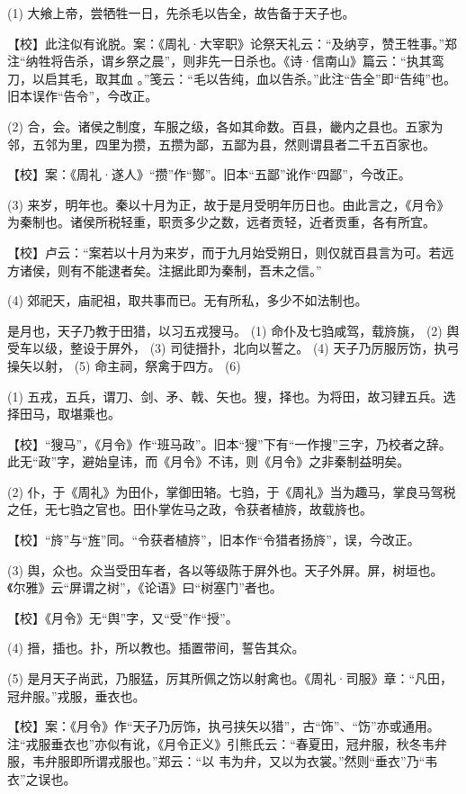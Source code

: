 \documentclass[12pt,UTF8]{ctexbook}
\begin{document}
(1) 大飨上帝，尝牺牲一日，先杀毛以告全，故告备于天子也。

【校】此注似有讹脱。案：《周礼·大宰职》论祭天礼云：“及纳亨，赞王牲事。”郑注“纳牲将告杀，谓乡祭之晨”，则非先一日杀也。《诗·信南山》篇云：“执其鸾刀，以启其毛，取其血 。”笺云：“毛以告纯，血以告杀。”此注“告全”即“告纯”也。旧本误作“告令”，今改正。

(2) 合，会。诸侯之制度，车服之级，各如其命数。百县，畿内之县也。五家为邻，五邻为里，四里为攒，五攒为鄙，五鄙为县，然则谓县者二千五百家也。

【校】案：《周礼·遂人》“攒”作“酂”。旧本“五鄙”讹作“四鄙”，今改正。

(3) 来岁，明年也。秦以十月为正，故于是月受明年历日也。由此言之，《月令》为秦制也。诸侯所税轻重，职贡多少之数，远者贡轻，近者贡重，各有所宜。

【校】卢云：“案若以十月为来岁，而于九月始受朔日，则仅就百县言为可。若远方诸侯，则有不能逮者矣。注据此即为秦制，吾未之信。”

(4) 郊祀天，庙祀祖，取共事而已。无有所私，多少不如法制也。

是月也，天子乃教于田猎，以习五戎獀马。 (1) 命仆及七驺咸驾，载旍旐， (2) 舆受车以级，整设于屏外， (3) 司徒搢扑，北向以誓之。 (4) 天子乃厉服厉饬，执弓操矢以射， (5) 命主祠，祭禽于四方。 (6)

(1) 五戎，五兵，谓刀、剑、矛、戟、矢也。獀，择也。为将田，故习肄五兵。选择田马，取堪乘也。

【校】“獀马”，《月令》作“班马政”。旧本“獀”下有“一作搜”三字，乃校者之辞。此无“政”字，避始皇讳，而《月令》不讳，则《月令》之非秦制益明矣。

(2) 仆，于《周礼》为田仆，掌御田辂。七驺，于《周礼》当为趣马，掌良马驾税之任，无七驺之官也。田仆掌佐马之政，令获者植旍，故载旍也。

【校】“旍”与“旌”同。“令获者植旍”，旧本作“令猎者扬旍”，误，今改正。

(3) 舆，众也。众当受田车者，各以等级陈于屏外也。天子外屏。屏，树垣也。《尔雅》云“屏谓之树”，《论语》曰“树塞门”者也。

【校】《月令》无“舆”字，又“受”作“授”。

(4) 搢，插也。扑，所以教也。插置带间，誓告其众。

(5) 是月天子尚武，乃服猛，厉其所佩之饬以射禽也。《周礼·司服》章：“凡田，冠弁服。”戎服，垂衣也。

【校】案：《月令》作“天子乃厉饰，执弓挟矢以猎”，古“饰”、“饬”亦或通用。注“戎服垂衣也”亦似有讹，《月令正义》引熊氏云：“春夏田，冠弁服，秋冬韦弁服，韦弁服即所谓戎服也。”郑云：“以 韦为弁，又以为衣裳。”然则“垂衣”乃“韦衣”之误也。
\end{document}
